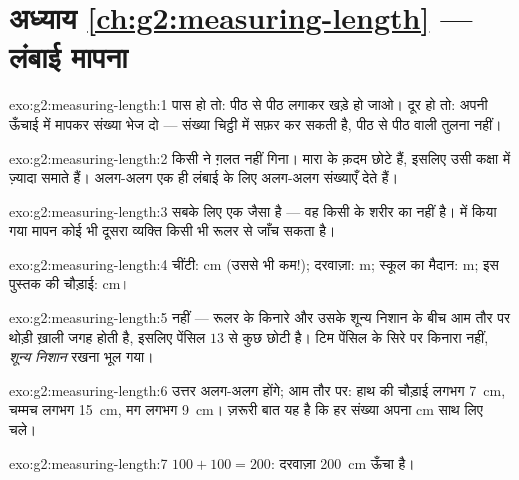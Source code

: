 \section*{अध्याय \ref{ch:g2:measuring-length} --- लंबाई मापना}

\begin{solution}{exo:g2:measuring-length:1}
पास हो तो: पीठ से पीठ लगाकर खड़े हो जाओ। दूर हो तो: अपनी ऊँचाई
 में मापकर संख्या भेज दो --- संख्या चिट्ठी में सफ़र कर सकती
है, पीठ से पीठ वाली तुलना नहीं।
\end{solution}

\begin{solution}{exo:g2:measuring-length:2}
किसी ने ग़लत नहीं गिना। मारा के क़दम छोटे हैं, इसलिए उसी कक्षा में
ज़्यादा समाते हैं। अलग-अलग  एक ही लंबाई के लिए अलग-अलग
संख्याएँ देते हैं।
\end{solution}

\begin{solution}{exo:g2:measuring-length:3}
 सबके लिए एक जैसा है --- वह किसी के शरीर का नहीं है।
 में किया गया मापन कोई भी दूसरा व्यक्ति किसी भी रूलर से जाँच
सकता है।
\end{solution}

\begin{solution}{exo:g2:measuring-length:4}
चींटी: \unit{cm} (उससे भी कम!); दरवाज़ा: \unit{m}; स्कूल का मैदान:
\unit{m}; इस पुस्तक की चौड़ाई: \unit{cm}।
\end{solution}

\begin{solution}{exo:g2:measuring-length:5}
नहीं --- रूलर के किनारे और उसके शून्य निशान के बीच आम तौर पर थोड़ी
ख़ाली जगह होती है, इसलिए पेंसिल $13$  से कुछ छोटी है। टिम
पेंसिल के सिरे पर किनारा नहीं, \emph{शून्य निशान} रखना भूल गया।
\end{solution}

\begin{solution}{exo:g2:measuring-length:6}
उत्तर अलग-अलग होंगे; आम तौर पर: हाथ की चौड़ाई लगभग \qty{7}{cm},
चम्मच लगभग \qty{15}{cm}, मग लगभग \qty{9}{cm}। ज़रूरी बात यह है कि
हर संख्या अपना \unit{cm} साथ लिए चले।
\end{solution}

\begin{solution}{exo:g2:measuring-length:7}
$100 + 100 = 200$: दरवाज़ा \qty{200}{cm} ऊँचा है।
\end{solution}

